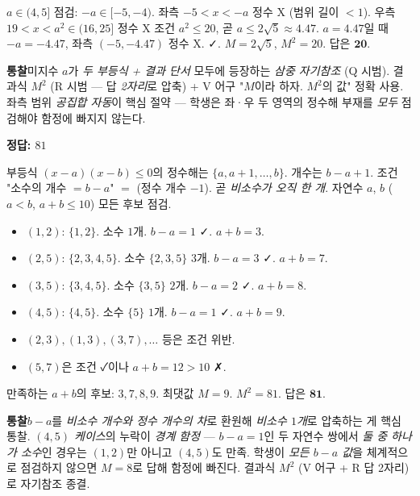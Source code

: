 \documentclass[10pt]{article}
\newcommand{\solnote}[1]{\par\smallskip\noindent
  \begin{tcolorbox}[enhanced, breakable, colback=vB-light, colframe=vB-light,
    boxrule=0pt, arc=3pt, left=10pt, right=10pt, top=4pt, bottom=4pt,
    fontupper=\sffamily\footnotesize\color{vB-ink}]
    \textbf{\color{vB-deep}통찰}\quad #1
  \end{tcolorbox}}
\begin{document}
$a \in (4, 5]$ 점검: $-a \in [-5, -4)$. 좌측 $-5 < x < -a$ 정수 X (범위 길이 $< 1$). 우측 $19 < x < a^2 \in (16, 25]$ 정수 X 조건 $a^2 \le 20$, 곧 $a \le 2\sqrt{5} \approx 4.47$. $a = 4.47$일 때 $-a = -4.47$, 좌측 $(-5, -4.47)$ 정수 X. ✓.
 $M = 2\sqrt{5}$, $M^2 = 20$.
답은 $\textbf{20}$.
\solnote{미지수 $a$가 \emph{두 부등식 + 결과 단서} 모두에 등장하는 \emph{삼중 자기참조} (Q 시범). 결과식 $M^2$ (R 시범 — 답 \emph{2자리}로 압축) + V 어구 "$M$이라 하자. $M^2$의 값" 정확 사용. 좌측 범위 \emph{공집합 자동}이 핵심 절약 — 학생은 좌·우 두 영역의 정수해 부재를 \emph{모두} 점검해야 함정에 빠지지 않는다.}

\begin{answerbox}\sffamily\bfseries 정답: $81$\end{answerbox}
 부등식 $(x - a)(x - b) \le 0$의 정수해는 $\{a, a+1, \ldots, b\}$. 개수는 $b - a + 1$.
 조건 "소수의 개수 $= b - a$" $=$ (정수 개수 $-1$). 곧 \emph{비소수가 오직 한 개}.
 자연수 $a$, $b$ ($a < b$, $a + b \le 10$) 모든 후보 점검.
\begin{itemize}\setlength{\itemsep}{0pt}
\item $(1, 2)$: $\{1, 2\}$. 소수 $1$개. $b - a = 1$ ✓. $a + b = 3$.
\item $(2, 5)$: $\{2, 3, 4, 5\}$. 소수 $\{2, 3, 5\}$ $3$개. $b - a = 3$ ✓. $a + b = 7$.
\item $(3, 5)$: $\{3, 4, 5\}$. 소수 $\{3, 5\}$ $2$개. $b - a = 2$ ✓. $a + b = 8$.
\item $(4, 5)$: $\{4, 5\}$. 소수 $\{5\}$ $1$개. $b - a = 1$ ✓. $a + b = 9$.
\item $(2, 3), (1, 3), (3, 7), \ldots$ 등은 조건 위반.
\item $(5, 7)$은 조건 ✓이나 $a + b = 12 > 10$ ✗.
\end{itemize}
 만족하는 $a + b$의 후보: $3, 7, 8, 9$. 최댓값 $M = 9$.
 $M^2 = 81$.
답은 $\textbf{81}$.
\solnote{$b - a$를 \emph{비소수 개수와 정수 개수의 차}로 환원해 \emph{비소수 $1$개}로 압축하는 게 핵심 통찰. \emph{$(4, 5)$ 케이스}의 누락이 \emph{경계 함정} — $b - a = 1$인 두 자연수 쌍에서 \emph{둘 중 하나가 소수}인 경우는 $(1, 2)$만 아니고 $(4, 5)$도 만족. 학생이 \emph{모든 $b - a$ 값}을 체계적으로 점검하지 않으면 $M = 8$로 답해 함정에 빠진다. 결과식 $M^2$ (V 어구 + R 답 2자리)로 자기참조 종결.}
\end{document}
